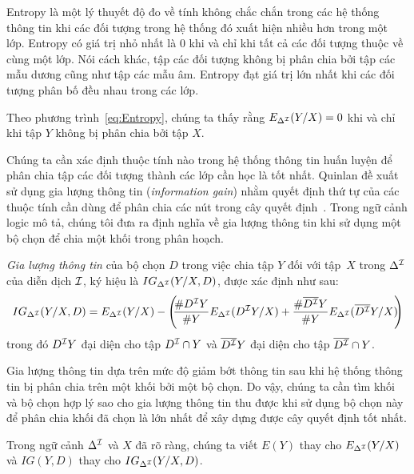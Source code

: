 Entropy là một lý thuyết độ đo về tính không chắc chắn trong các hệ thống thông tin khi các đối tượng trong hệ thống đó xuất hiện nhiều hơn trong một lớp. Entropy có giá trị nhỏ nhất là 0 khi và chỉ khi tất cả các đối tượng thuộc về cùng một lớp. Nói cách khác, tập các đối tượng không bị phân chia bởi tập các mẫu dương cũng như tập các mẫu âm.
Entropy đạt giá trị lớn nhất khi các đối tượng phân bố đều nhau trong các lớp.

\begin{Remark}
	Theo phương trình~\eqref{eq:Entropy}, chúng ta thấy rằng $E_{\Delta^{\mathcal{I}}}(Y/X) = 0$ khi và chỉ khi tập $Y$ không bị phân chia bởi tập $X$.
\end{Remark}

Chúng ta cần xác định thuộc tính nào trong hệ thống thông tin huấn luyện để phân chia tập các đối tượng thành các lớp cần học là tốt nhất. Quinlan đề xuất sử dụng gia lượng thông tin ({\em information gain}) nhằm quyết định thứ tự của các thuộc tính cần dùng để phân chia các nút trong cây quyết định~\cite{Quinlan1986}. Trong ngữ cảnh logic mô tả, chúng tôi đưa ra định nghĩa về gia lượng thông tin khi sử dụng một bộ chọn để chia một khối trong phân hoạch.

\begin{Definition}
	{\em Gia lượng thông tin} của bộ chọn $D$ trong việc chia tập $Y$ đối với tập~$X$ trong $\Delta^{\mathcal{I}}$ của diễn dịch $\mathcal{I}$, ký hiệu là $IG_{\Delta^{\mathcal{I}}}(Y/X, D)$, được xác định như sau:
	\begin{equation}
		IG_{\Delta^{\mathcal{I}}}(Y/X, D) = E_{\Delta^{\mathcal{I}}}(Y/X)-
		\left(\!\!\frac{\# D^{\mathcal{I}} Y}{\# Y}E_{\Delta^{\mathcal{I}}}(D^{\mathcal{I}} Y/X)+\frac{\# \overline{D^{\mathcal{I}}}Y}{\# Y}E_{\Delta^{\mathcal{I}}}(\overline{D^{\mathcal{I}}}Y/X)\!\!\right)  \label{eq:InfoGain}
	\end{equation}
	trong đó $D^{\mathcal{I}} Y$ đại diện cho tập $D^{\mathcal{I}} \cap Y$ và $\overline{D^{\mathcal{I}}}Y$ đại diện cho tập $\overline{D^{\mathcal{I}}} \cap Y$.\myend
\end{Definition}

Gia lượng thông tin dựa trên mức độ giảm bớt thông tin sau khi hệ thống thông tin bị phân chia trên một khối bởi một bộ chọn. Do vậy, chúng ta cần tìm khối và bộ chọn hợp lý sao cho gia lượng thông tin thu được khi sử dụng bộ chọn này để phân chia khối đã chọn là lớn nhất để xây dựng được cây quyết định tốt nhất.

Trong ngữ cảnh $\Delta^{\mathcal{I}}$ và $X$ đã rõ ràng, chúng ta viết $E(Y)$ thay cho $E_{\Delta^{\mathcal{I}}}(Y/X)$ và $IG(Y, D)$ thay cho $IG_{\Delta^{\mathcal{I}}}(Y/X, D)$.

